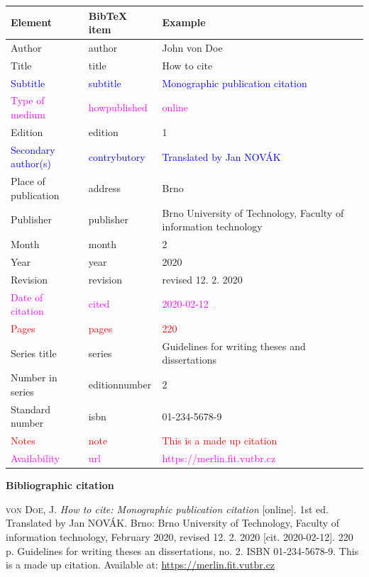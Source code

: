 \begin{tabularx}{\linewidth}{X X X}
    Element & BibTeX item & Example\\\hline
    Author & author & John von Doe\\
    Title & title & How to cite\\
    \textcolor{blue}{Subtitle} & \textcolor{blue}{subtitle} & \textcolor{blue}{Monographic publication citation}\\
    \textcolor{magenta}{Type of medium} & \textcolor{magenta}{howpublished} & \textcolor{magenta}{online}\\
    Edition & edition & 1\\
    \textcolor{blue}{Secondary author(s)} & \textcolor{blue}{contrybutory} & \textcolor{blue}{Translated by Jan NOVÁK}\\
    Place of publication & address & Brno\\
    Publisher & publisher & Brno University of Technology, Faculty of information technology\\
    Month & month & 2\\
    Year & year & 2020\\
    Revision & revision & revised 12. 2. 2020\\
    \textcolor{magenta}{Date of citation} & \textcolor{magenta}{cited} & \textcolor{magenta}{2020-02-12}\\
    \textcolor{red}{Pages} & \textcolor{red}{pages} & \textcolor{red}{220}\\
    Series title & series & Guidelines for writing theses and dissertations\\
    Number in series & editionnumber & 2\\
    Standard number & isbn & 01-234-5678-9\\
    \textcolor{red}{Notes} & \textcolor{red}{note} & \textcolor{red}{This is a made up citation}\\
    \textcolor{magenta}{Availability} & \textcolor{magenta}{url} & \textcolor{magenta}{https://merlin.fit.vutbr.cz}\\
\end{tabularx}

\bigskip

\noindent \textbf{Bibliographic citation}

\medskip

\noindent \textsc{von Doe}, J. \textit{How to cite: Monographic publication citation} [online]. 1st ed. Translated by Jan NOVÁK.
Brno: Brno University of Technology, Faculty of information technology, February 2020, revised 12. 2. 2020 [cit. 2020-02-12]. 220 p. Guidelines for writing theses an dissertations, no. 2. ISBN 01-234-5678-9. This is a made up citation. Available at: \url{https://merlin.fit.vutbr.cz}
\newpage

